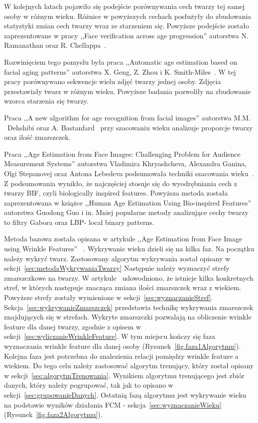 \documentclass[a4paper,twoside,12pt]{book}
\begin{document}
    W kolejnych latach pojawiło się podejście porównywania cech twarzy tej samej osoby w różnym wieku.
    Różnice w powyższych cechach posłużyły do zbudowania statystyki zmian cech twarzy wraz ze starzeniem się.
    Powyższe podejście zostało zaprezentowane w pracy ,,Face verification across age progression''
    autorstwa N. Ramanathan oraz R. Chellappa~\cite{ramanthanChelappa}.

    Rozwinięciem tego pomysłu była praca ,,Automatic age estimation based
    on facial aging patterns'' autorstwa X. Geng, Z. Zhou i K. Smith-Miles~\cite{gengZhou}.
    W tej pracy porównywano sekwencje wielu zdjęć twarzy jednej osoby.
    Zdjęcia przestawiały twarz w różnym wieku.
    Powyższe badania pozwoliły na zbudowanie wzorca starzenia się twarzy.

    Praca ,,A new algorithm for age recognition
    from facial images'' autorstwa M.M. \ Dehshibi oraz A. Bastanfard~\cite{dehshibiBastard} przy szacowaniu wieku
    analizuje proporcje twarzy oraz ilość zmarszczek.

    Praca ,,Age Estimation from Face Images: Challenging
    Problem for Audience Measurement Systems'' autorstwa
    Vladimira Khryashcheva, Alexandra Ganina, Olgi Stepanovej oraz
    Antona Lebedeva podsumowała techniki szacowania wieku~\cite{khryashchevGanin}.
    Z podsumowania wynikło, że najczęściej stosuje się do wyodrębniania cech z twarzy BIF,
    czyli biologically inspired features.
    Powyższa metoda została zaprezentowana w książce ,,Human Age Estimation Using Bio-inspired Features''
    autorstwa Guodong Guo i in.
    Mniej popularne metody analizujące cechy twarzy to filtry Gabora oraz LBP- local binary patterns.


    Metoda bazowa została opisana w artykule ,,Age Estimation from Face Image using Wrinkle Features''
    ~\cite{wrinkleFeatures}.
    Wykrywanie wieku dzieli się na kilka faz.
    Na początku należy wykryć twarz.
    Zastosowany algorytm wykrywania został
    opisany w sekcji~\ref{sec:metodaWykrywaniaTwarzy}
    Następnie należy wyznaczyć strefy zmarszczkowe na twarzy.
    W artykule~\cite{wrinkleFeatures} udowodniono,
    że istnieje kilka konkretnych stref, w których następuje znacząca zmiana ilości zmarszczek wraz z wiekiem.
    Powyższe strefy zostały wymienione w sekcji~\ref{sec:wyznaczanieStref}.
    Sekcja~\ref{sec:wykrywanieZmarszczek} przedstawia technikę wykrywania zmarszczek znajdujących się w strefach.
    Wykryte zmarszczki
    pozwalają na obliczenie wrinkle feature dla danej twarzy, zgodnie z opisem w sekcji~\ref{sec:wyliczanieWrinkleFeature}.
    W tym miejscu kończy się faza wyznaczania wrinkle feature dla danej osoby (Rysunek~\ref{fig.faza1Algorytmu}).
    Kolejna faza
    jest potrzebna do
    znalezienia relacji pomiędzy wrinkle feature a wiekiem.
    Do tego celu należy zastosować algorytm trenujący, który
    został opisany w sekcji~\ref{sec:algorytmTrenowania}.
    Wynikiem algorytmu trenującego jest zbiór danych, który
    należy pogrupować, tak jak to opisano w sekcji~\ref{sec:grupowanieDanych}.
    Ostatnią fazą algorytmu jest wykrywanie wieku
    na podstawie wyników działania FCM - sekcja~\ref{sec:wyznaczanieWieku} (Rysunek~\ref{fig.faza2Algorytmu}).
\end{document}
